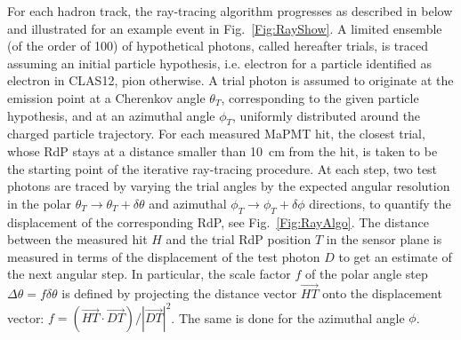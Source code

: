 For each hadron track, the ray-tracing algorithm progresses as described in below and illustrated for an example
event in Fig.~\ref{Fig:RayShow}. A limited ensemble (of the order of 100) of hypothetical photons, called hereafter
trials, is traced assuming an initial particle hypothesis, i.e. electron for a particle identified as electron in CLAS12,
pion otherwise. A trial photon is assumed to originate at the emission point at a Cherenkov angle $\theta_T$,
corresponding to the given particle hypothesis, and at an azimuthal angle $\phi_T$, uniformly distributed around
the charged particle trajectory. For each measured MaPMT hit, the closest trial, whose RdP stays at a distance
smaller than 10~cm from the hit, is taken to be the starting point of the iterative ray-tracing procedure. At each
step, two test photons are traced by varying the trial angles by the expected angular resolution in the polar
$\theta_T \to \theta_T + \delta \theta$ and azimuthal $\phi_T \to \phi_T + \delta \phi$ directions, to quantify
the displacement of the corresponding RdP, see Fig.~\ref{Fig:RayAlgo}. The distance between the measured hit
$H$ and the trial RdP position $T$ in the sensor plane is measured in terms of the displacement of the test photon
$D$ to get an estimate of the next angular step. In particular, the scale factor $f$ of the polar angle step
$\Delta \theta = f \delta \theta$ is defined by projecting the distance vector $\vec{HT}$ onto the displacement
vector: $f=(\vec{HT}\cdot \vec {DT}) / |\vec{DT}|^2$. The same is done for the azimuthal angle $\phi$.

